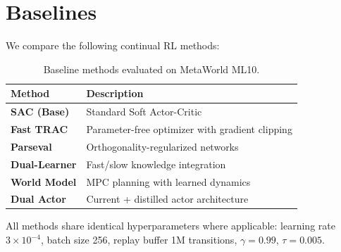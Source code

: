 \documentclass{article}
\begin{document}
\section{Baselines}

We compare the following continual RL methods:

\begin{table}[h]
\centering
\caption{Baseline methods evaluated on MetaWorld ML10.}
\label{tab:baselines}
\begin{tabular}{ll}
\toprule
Method & Description \\
\midrule
\textbf{SAC (Base)} & Standard Soft Actor-Critic \\
\textbf{Fast TRAC} & Parameter-free optimizer with gradient clipping \\
\textbf{Parseval} & Orthogonality-regularized networks \\
\textbf{Dual-Learner} & Fast/slow knowledge integration \\
\textbf{World Model} & MPC planning with learned dynamics \\
\textbf{Dual Actor} & Current + distilled actor architecture \\
\bottomrule
\end{tabular}
\end{table}

All methods share identical hyperparameters where applicable: learning rate $3 \times 10^{-4}$, batch size 256, replay buffer 1M transitions, $\gamma=0.99$, $\tau=0.005$.
\end{document}
